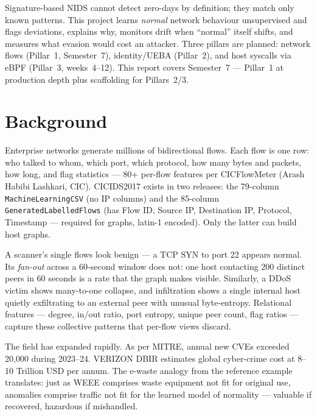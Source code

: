 \documentclass[12pt,a4paper,oneside]{report}
\begin{document}
Signature-based NIDS cannot detect zero-days by definition; they match only known patterns. This project learns \textit{normal} network behaviour unsupervised and flags deviations, explains why, monitors drift when ``normal'' itself shifts, and measures what evasion would cost an attacker. Three pillars are planned: network flows (Pillar~1, Semester~7), identity/UEBA (Pillar~2), and host syscalls via eBPF (Pillar~3, weeks~4--12). This report covers Semester~7 — Pillar~1 at production depth plus scaffolding for Pillars~2/3.

\section{Background}
Enterprise networks generate millions of bidirectional flows. Each flow is one row: who talked to whom, which port, which protocol, how many bytes and packets, how long, and flag statistics — 80+ per-flow features per CICFlowMeter (Arash Habibi Lashkari, CIC). CICIDS2017 exists in two releases: the 79-column \texttt{MachineLearningCSV} (no IP columns) and the 85-column \texttt{GeneratedLabelledFlows} (has Flow ID, Source IP, Destination IP, Protocol, Timestamp — required for graphs, latin-1 encoded). Only the latter can build host graphs.

A scanner's single flows look benign — a TCP SYN to port 22 appears normal. Its \textit{fan-out} across a 60-second window does not: one host contacting 200 distinct peers in 60 seconds is a rate that the graph makes visible. Similarly, a DDoS victim shows many-to-one collapse, and infiltration shows a single internal host quietly exfiltrating to an external peer with unusual byte-entropy. Relational features — degree, in/out ratio, port entropy, unique peer count, flag ratios — capture these collective patterns that per-flow views discard.

The field has expanded rapidly. As per MITRE, annual new CVEs exceeded 20,000 during 2023--24. VERIZON DBIR estimates global cyber-crime cost at 8--10 Trillion USD per annum. The e-waste analogy from the reference example translates: just as WEEE comprises waste equipment not fit for original use, anomalies comprise traffic not fit for the learned model of normality — valuable if recovered, hazardous if mishandled.
\end{document}
